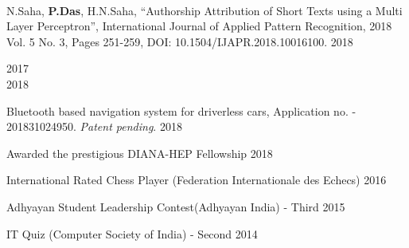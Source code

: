 \documentclass[10pt, letterpaper]{deps1}
\begin{document}
%
%
\vspace{-5pt}
\\
\vspace{-5pt}

%
%
\small{\begin{tightitemize}
    \item N.Saha, {\textbf{P.Das}}, H.N.Saha, ``Authorship Attribution of Short Texts using a Multi Layer Perceptron'', International Journal of Applied Pattern Recognition, 2018 Vol. 5 No. 3, Pages 251-259, DOI: 10.1504/IJAPR.2018.10016100. \hfill{2018}
\end{tightitemize}}

%
%
\hfill{2017}\\
\hfill{2018}\vspace{5pt}

%
%
\small{\begin{tightitemize}
    \item Bluetooth based navigation system for driverless cars, Application no. - 201831024950. {\textit{Patent pending}}. \hfill{2018}
\end{tightitemize}}

%
%
\begin{tightitemize}
	\item Awarded the prestigious DIANA-HEP Fellowship \hfill{2018}
	\item International Rated Chess Player (Federation Internationale des Echecs) \hfill{2016}
	\item Adhyayan Student Leadership Contest(Adhyayan India) - Third \hfill{2015}
	\item IT Quiz (Computer Society of India) - Second \hfill{2014}
\end{tightitemize}
\end{document}
